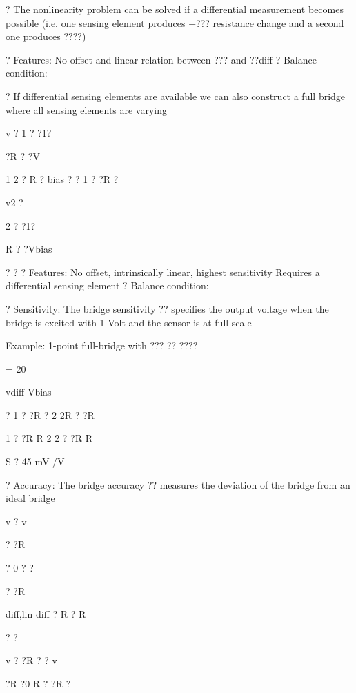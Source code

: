 \documentclass[2pt,landscape]{article}
\begin{document}
\begin{multicols*}{5}
?	The nonlinearity problem can be solved if
a differential measurement becomes possible 
(i.e. one sensing element produces
+??? resistance change and a second 
one produces ????)

?	Features:
\textbullet 	No offset and linear relation between ??? and ??diff
?	Balance condition:



?	If differential sensing elements are 
available we can also construct a full 
bridge where all sensing elements 
are varying


v ? 1 ? ?1?




?R ? ?V



1	2 ?	R ?	bias
?	?
1 ?	?R ?


v2 ?


2 ? ?1?


R ? 
?Vbias


?	?
?	Features:
\textbullet 	No offset, intrinsically linear, highest sensitivity
\textbullet 	Requires a differential sensing element
?	Balance condition:







?	Sensitivity:
The bridge sensitivity ?? specifies the output voltage when the bridge is 
excited with 1 Volt and the sensor is at full scale


Example: 1-point full-bridge with ???
?? ????


= 20 %


vdiff
Vbias


? 1 ?	?R	?
2 2R ? 
?R


1 ? ?R R	
2 2 ? ?R 
R



S ? 
45 
mV
/V



?	Accuracy:
The bridge accuracy ?? measures the deviation of the bridge from an 
ideal bridge


v	? v


? ?R


? 0 ? ?


? ?R



diff,lin	diff ? R	?	R


?	?

v	? ?R ? ? v






?R ?0
R
? ?R ?




\end{multicols*}
\end{document}
